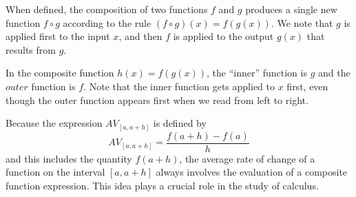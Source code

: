 \documentclass{ximera}
\begin{document}

\begin{summary}
\item When defined, the composition of two functions \(f\) and \(g\) produces a single new function \(f \circ g\) according to the rule \((f \circ g)(x) = f(g(x))\).  We note that \(g\) is applied first to the input \(x\), and then \(f\) is applied to the output \(g(x)\) that results from \(g\).
\item In the composite function \(h(x) = f(g(x))\), the ``inner'' function is \(g\) and the \(outer\) function is \(f\).  Note that the inner function gets applied to \(x\) first, even though the outer function appears first when we read from left to right. 
\item Because the expression \(AV_{[a,a+h]}\) is defined by%
\begin{equation*}
AV_{[a,a+h]} = \frac{f(a+h) - f(a)}{h} 
\end{equation*}
and this includes the quantity \(f(a+h)\), the average rate of change of a function on the interval \([a,a+h]\) always involves the evaluation of a composite function expression.  This idea plays a crucial role in the study of calculus.
\end{summary}
\end{document}
